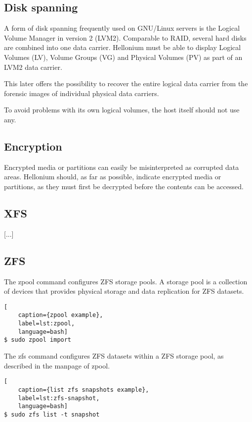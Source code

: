 \subsection{Disk spanning}

A form of disk spanning frequently used on GNU/Linux servers is the Logical Volume Manager in version 2 (LVM2). Comparable to RAID, several hard disks are combined into one data carrier. Hellonium must be able to display Logical Volumes (LV), Volume Groups (VG) and Physical Volumes (PV) as part of an LVM2 data carrier.

This later offers the possibility to recover the entire logical data carrier from the forensic images of individual physical data carriers.

To avoid problems with its own logical volumes, the host itself should not use any.

\subsection{Encryption}

Encrypted media or partitions can easily be misinterpreted as corrupted data areas. Hellonium should, as far as possible, indicate encrypted media or partitions, as they must first be decrypted before the contents can be accessed.

\subsection{XFS}

[...]

\subsection{ZFS}

The zpool command configures ZFS storage pools. A storage pool is a collection of devices that provides physical storage and data replication for ZFS datasets.

\begin{lstlisting}[
    caption={zpool example},
    label=lst:zpool,
    language=bash]
$ sudo zpool import
\end{lstlisting}

The zfs command configures ZFS datasets within a ZFS storage pool, as described in the manpage of zpool.

\begin{lstlisting}[
    caption={list zfs snapshots example},
    label=lst:zfs-snapshot,
    language=bash]
$ sudo zfs list -t snapshot
\end{lstlisting}

